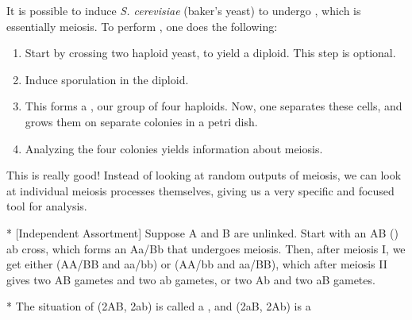 \begin{exper}
	It is possible to induce \emph{S. cerevisiae} (baker's yeast) to undergo , which is essentially meiosis. To perform , one does the following:
	\begin{enumerate}
		\item Start by crossing two haploid yeast, to yield a diploid. This step is optional.
		\item Induce sporulation in the diploid.
		\item This forms a , our group of four haploids. Now, one separates these cells, and grows them on separate colonies in a petri dish.
		\item Analyzing the four colonies yields information about meiosis.
	\end{enumerate}
\end{exper}

This is really good!
Instead of looking at random outputs of meiosis, we can look at individual meiosis processes themselves, giving us a very specific and focused tool for analysis.

\begin{exm}*
	[Independent Assortment]
	Suppose A and B are unlinked. 
	Start with an AB (\x) ab cross, which forms an Aa/Bb that undergoes meiosis. Then, after meiosis I, we get either (AA/BB and aa/bb) or (AA/bb and aa/BB), which after meiosis II gives two AB gametes and two ab gametes, or two Ab and two aB gametes.
\end{exm}

\begin{defn}*
	The situation of (2AB, 2ab) is called a , and (2aB, 2Ab) is a  
\end{defn}

